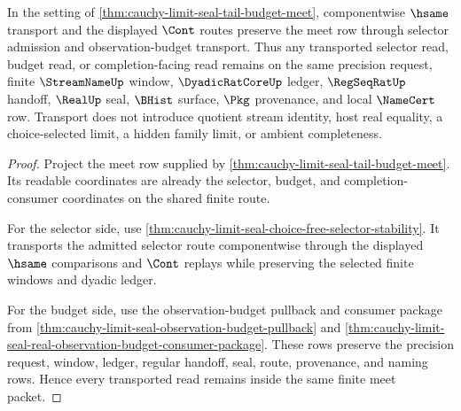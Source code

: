 \begin{theorem}
\label{thm:cauchy-limit-seal-selector-budget-transport}
In the setting of \autoref{thm:cauchy-limit-seal-tail-budget-meet}, componentwise $\hsame$ transport and the displayed $\Cont$ routes preserve the meet row through selector admission and observation-budget transport. Thus any transported selector read, budget read, or completion-facing read remains on the same precision request, finite $\StreamNameUp$ window, $\DyadicRatCoreUp$ ledger, $\RegSeqRatUp$ handoff, $\RealUp$ seal, $\BHist$ surface, $\Pkg$ provenance, and local $\NameCert$ row. Transport does not introduce quotient stream identity, host real equality, a choice-selected limit, a hidden family limit, or ambient completeness.
\end{theorem}
\begin{proof}
Project the meet row supplied by \autoref{thm:cauchy-limit-seal-tail-budget-meet}. Its readable coordinates are already the selector, budget, and completion-consumer coordinates on the shared finite route.

For the selector side, use \autoref{thm:cauchy-limit-seal-choice-free-selector-stability}. It transports the admitted selector route componentwise through the displayed $\hsame$ comparisons and $\Cont$ replays while preserving the selected finite windows and dyadic ledger.

For the budget side, use the observation-budget pullback and consumer package from \autoref{thm:cauchy-limit-seal-observation-budget-pullback} and \autoref{thm:cauchy-limit-seal-real-observation-budget-consumer-package}. These rows preserve the precision request, window, ledger, regular handoff, seal, route, provenance, and naming rows. Hence every transported read remains inside the same finite meet packet.
\end{proof}

